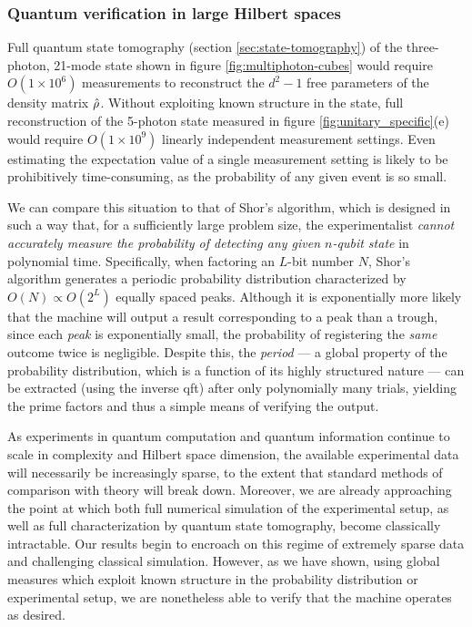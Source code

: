 \subsubsection{Quantum verification in large Hilbert spaces}
\label{sec:bs-verification}
Full quantum state tomography (section \ref{sec:state-tomography}) of the three-photon, 21-mode state shown in figure \ref{fig:multiphoton-cubes} would require $O(1\times10^6)$ measurements to reconstruct the $d^2-1$ free parameters of the density matrix $\hat{\rho}$. Without exploiting known structure in the state, full reconstruction of the 5-photon state measured in figure \ref{fig:unitary_specific}(e) would require $O(1\times10^9)$ linearly independent measurement settings. Even estimating the expectation value of a single measurement setting is likely to be prohibitively time-consuming, as the probability of any given event is so small.

We can compare this situation to that of Shor's algorithm, which is designed in such a way that, for a sufficiently large problem size, the experimentalist \emph{cannot accurately measure the probability of detecting any given $n$-qubit state} in polynomial time. Specifically, when factoring an $L$-bit number $N$, Shor's algorithm  generates a periodic probability distribution characterized by $O(N) \propto O(2^L)$ equally spaced peaks.
Although it is exponentially more likely that the machine will output a result corresponding to a peak than a trough, since each \emph{peak} is exponentially small, the probability of registering the \emph{same} outcome twice is negligible. Despite this, the \emph{period} --- a global property of the probability distribution, which is a function of its highly structured nature --- can be extracted (using the inverse \gls{qft}) after only polynomially many trials, yielding the prime factors and thus a simple means of verifying the output. 

As experiments in quantum computation and quantum information continue to scale in complexity and Hilbert space dimension, the available experimental data will necessarily be increasingly sparse, to the extent that standard methods of comparison with theory will break down. Moreover, we are already approaching the point at which both full numerical simulation of the experimental setup, as well as full characterization by quantum state tomography, become classically intractable. Our results begin to encroach on this regime of extremely sparse data and challenging classical simulation. However, as we have shown, using global measures which exploit known structure in the probability distribution or experimental setup, we are nonetheless able to verify that the machine operates as desired. 

